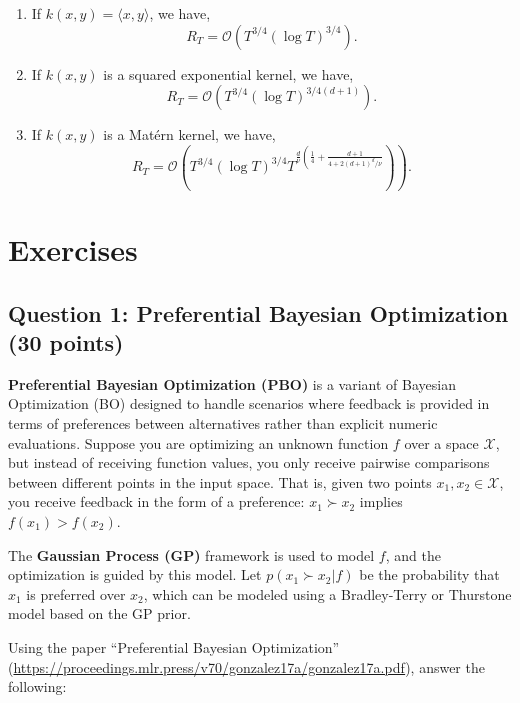 \documentclass[
  letterpaper,
  numbers=noenddot,
  DIV=11]{scrreprt}
\theoremstyle{plain}
\theoremstyle{definition}
\theoremstyle{plain}
\theoremstyle{remark}
\begin{document}
\begin{enumerate}
\def\labelenumi{\arabic{enumi}.}
\item
  If \(k(x, y)=\langle x, y\rangle\), we have,
  \[R_T=\mathcal{O}\left(T^{3 / 4}(\log T)^{3 / 4}\right) .\]
\item
  If \(k(x, y)\) is a squared exponential kernel, we have,
  \[R_T=\mathcal{O}\left(T^{3 / 4}(\log T)^{3 / 4(d+1)}\right) .\]
\item
  If \(k(x, y)\) is a Matérn kernel, we have,
  \[\left.R_T=\mathcal{O}\left(T^{3 / 4}(\log T)^{3 / 4} T^{\frac{d}{\nu}\left(\frac{1}{4}+\frac{d+1}{4+2(d+1)^d / \nu}\right.}\right)\right).\]
\end{enumerate}

\section{Exercises}\label{exercises-2}

\subsection*{Question 1: Preferential Bayesian Optimization (30
points)}\label{sec-question-1-preferential-bayesian-optimization-30-points}

\textbf{Preferential Bayesian Optimization (PBO)} is a variant of
Bayesian Optimization (BO) designed to handle scenarios where feedback
is provided in terms of preferences between alternatives rather than
explicit numeric evaluations. Suppose you are optimizing an unknown
function \(f\) over a space \(\mathcal{X}\), but instead of receiving
function values, you only receive pairwise comparisons between different
points in the input space. That is, given two points
\(x_1, x_2 \in \mathcal{X}\), you receive feedback in the form of a
preference: \(x_1 \succ x_2\) implies \(f(x_1) > f(x_2)\).

The \textbf{Gaussian Process (GP)} framework is used to model \(f\), and
the optimization is guided by this model. Let \(p(x_1 \succ x_2 | f)\)
be the probability that \(x_1\) is preferred over \(x_2\), which can be
modeled using a Bradley-Terry or Thurstone model based on the GP prior.

Using the paper ``Preferential Bayesian Optimization''
(\url{https://proceedings.mlr.press/v70/gonzalez17a/gonzalez17a.pdf}),
answer the following:
\end{document}
